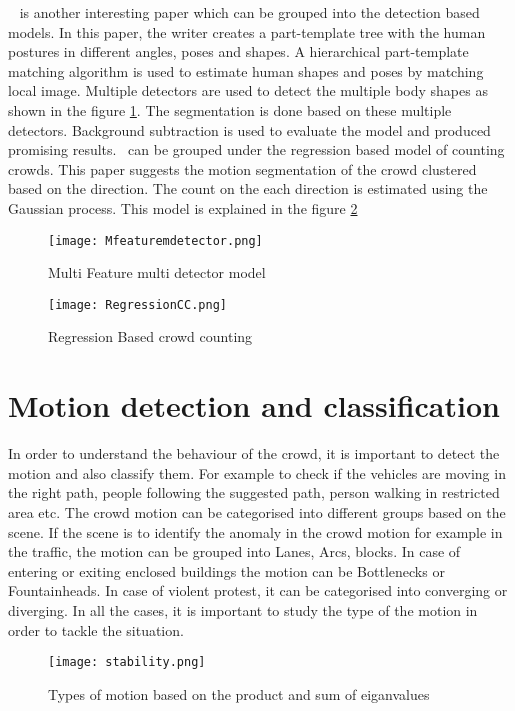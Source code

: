 ~\cite{5374413} is another interesting paper which can be grouped into the detection based models. In 
this paper, the writer creates a part-template tree with the human postures in different angles, poses 
and shapes. A hierarchical part-template matching algorithm is used to estimate human shapes and 
poses by matching local image. Multiple detectors are used to detect the multiple body shapes as 
shown in the figure \ref{fig:rmfmdcc}. The segmentation is done based on these multiple detectors. 
Background subtraction is used to evaluate the model and produced promising 
results.~\cite{chan2008privacy} can be grouped under the regression based model of counting crowds. 
This paper suggests the motion segmentation of the crowd clustered based on the direction. The count 
on the each direction is estimated using the Gaussian process. This model is explained in the figure 
\ref{fig:regcc}

\begin{figure}[tb]
	\center\texttt{[image: Mfeaturemdetector.png]}
	\caption{Multi Feature multi detector model ~\cite{5374413}}
	\label{fig:rmfmdcc}
\end{figure}

\begin{figure}[tb]
	\center\texttt{[image: RegressionCC.png]}
	\caption{Regression Based crowd counting ~\cite{chan2008privacy}}
	\label{fig:regcc}
\end{figure}

\section{Motion detection and classification}
In order to understand the behaviour of the crowd, it is important to detect the motion and also classify 
them. For example to check if the vehicles are moving in the right path, people following the suggested 
path, person walking in restricted area etc. The crowd motion can be categorised into different groups 
based on the scene. If the scene is to identify the anomaly in the crowd motion for example in the traffic, 
the motion can be grouped into Lanes, Arcs, blocks. In case of entering or exiting enclosed buildings 
the motion can be Bottlenecks or Fountainheads. In case of violent protest, it can be categorised into 
converging or diverging. In all the cases, it is important to study the type of the motion in order to tackle 
the situation.

\begin{figure}[tb]
	\center\texttt{[image: stability.png]}
	\caption{Types of motion based on the product and sum of eiganvalues ~\cite{solmaz2012identifying} }
	\label{fig:stability}
\end{figure}

